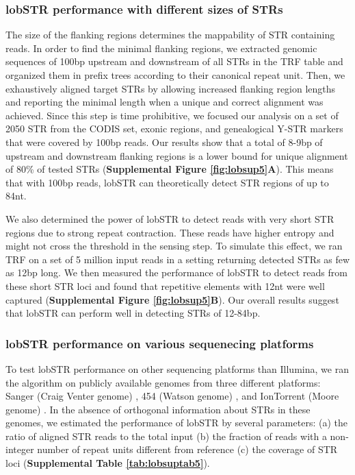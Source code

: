 \subsubsection{lobSTR performance with different sizes of STRs}
The size of the flanking regions determines the mappability of STR containing reads. In order to find the minimal flanking regions, we extracted genomic sequences of 100bp upstream and downstream of all STRs in the TRF table and organized them in prefix trees according to their canonical repeat unit. Then, we exhaustively aligned target STRs by allowing increased flanking region lengths and reporting the minimal length when a unique and correct alignment was achieved. Since this step is time prohibitive, we focused our analysis on a set of 2050 STR from the CODIS set, exonic regions, and genealogical Y-STR markers that were covered by 100bp reads. Our results show that a total of 8-9bp of upstream and downstream flanking regions is a lower bound for unique alignment of 80\% of tested STRs (\textbf{Supplemental Figure \ref{fig:lobsup5}A}). This means that with 100bp reads, lobSTR can theoretically detect STR regions of up to 84nt.  

We also determined the power of lobSTR to detect reads with very short STR regions due to strong repeat contraction. These reads have higher entropy and might not cross the threshold in the sensing step. To simulate this effect, we ran TRF on a set of 5 million input reads in a setting returning detected STRs as few as 12bp long. We then measured the performance of lobSTR to detect reads from these short STR loci and found that repetitive elements with 12nt were well captured (\textbf{Supplemental Figure \ref{fig:lobsup5}B}). Our overall results suggest that lobSTR can perform well in detecting STRs of 12-84bp. 

\subsubsection{lobSTR performance on various sequenecing platforms}
To test lobSTR performance on other sequencing platforms than Illumina, we ran the algorithm on publicly available genomes from three different platforms: Sanger (Craig Venter genome) \cite{LevySuttonNgEtAl2007}, 454 (Watson genome) \cite{WheelerSrinivasanEgholmEtAl2008}, and IonTorrent (Moore genome) \cite{RothbergHinzRearickEtAl2011}. In the absence of orthogonal information about STRs in these genomes, we estimated the performance of lobSTR by several parameters: (a) the ratio of aligned STR reads to the total input (b) the fraction of reads with a non-integer number of repeat units different from reference (c) the coverage of STR loci (\textbf{Supplemental Table \ref{tab:lobsuptab5}}).

